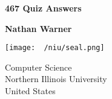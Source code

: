 \documentclass{report}
\title{\Huge{}}
\author{\huge{Nathan Warner}}
\date{\huge{}}
\begin{document}
        \begin{titlepage}
       \begin{center}
           \vspace*{1cm}
    
           \textbf{467 Quiz Answers}
    
           \vspace{0.5cm}
                
                
           \vspace{1.5cm}
    
           \textbf{Nathan Warner}
    
           \vfill
                
                
           \vspace{0.8cm}
         
           \texttt{[image: ~/niu/seal.png]}
                
           Computer Science \\
           Northern Illinois University\\
           United States\\
           
                
       \end{center}
    \end{titlepage}
    \tableofcontents
    \pagebreak 
\end{document}
